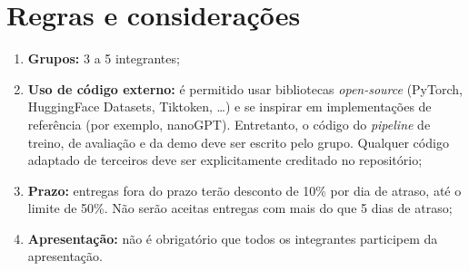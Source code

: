 \documentclass{dlproblemset}
\begin{document}
\section*{Regras e considerações}

\begin{enumerate}[1)]
    \item \textbf{Grupos:} 3 a 5 integrantes;
    \item \textbf{Uso de código externo:} é permitido usar bibliotecas \textit{open-source} (PyTorch, HuggingFace Datasets, Tiktoken, \ldots) e se inspirar em implementações de referência (por exemplo, nanoGPT). Entretanto, o código do \textit{pipeline} de treino, de avaliação e da demo deve ser escrito pelo grupo. Qualquer código adaptado de terceiros deve ser explicitamente creditado no repositório;
    \item \textbf{Prazo:} entregas fora do prazo terão desconto de 10\% por dia de atraso, até o limite de 50\%. Não serão aceitas entregas com mais do que 5 dias de atraso;
    \item \textbf{Apresentação:} não é obrigatório que todos os integrantes participem da apresentação.
\end{enumerate}
\end{document}
